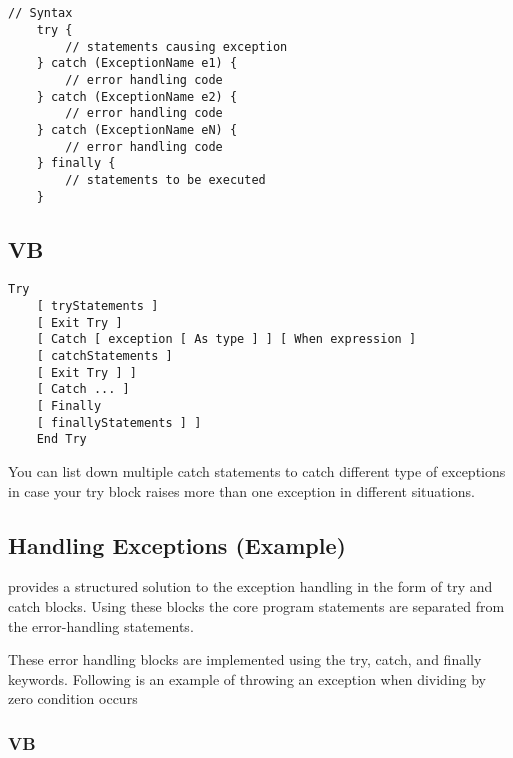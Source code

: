 \subsection*{{\cs}}
\begin{lstlisting}[numbers=none]
	// Syntax	
	try {
		// statements causing exception
	} catch (ExceptionName e1) {
		// error handling code
	} catch (ExceptionName e2) {
		// error handling code
	} catch (ExceptionName eN) {
		// error handling code
	} finally {
		// statements to be executed
	}
\end{lstlisting}

\subsection*{VB}
\begin{lstlisting}[style=vb, numbers=none]
	Try
	[ tryStatements ]
	[ Exit Try ]
	[ Catch [ exception [ As type ] ] [ When expression ]
	[ catchStatements ]
	[ Exit Try ] ]
	[ Catch ... ]
	[ Finally
	[ finallyStatements ] ]
	End Try
\end{lstlisting}

You can list down multiple catch statements to catch different type of exceptions in case your try
block raises more than one exception in different situations.

\subsection*{Handling Exceptions (Example)}
{\cs} provides a structured solution to the exception handling in the form of try and catch blocks.
Using these blocks the core program statements are separated from the error-handling statements.

These error handling blocks are implemented using the try, catch, and finally keywords. Following
is an example of throwing an exception when dividing by zero condition occurs





\subsubsection*{VB}


